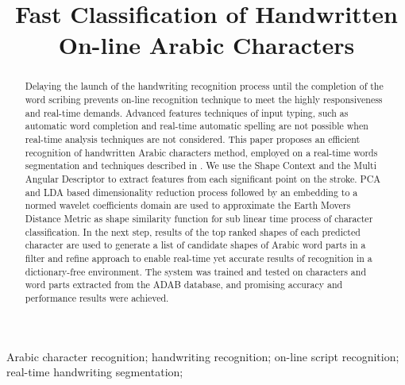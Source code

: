 \documentclass[10pt, conference, compsocconf]{IEEEtran}
\begin{document}
\title{Fast Classification of Handwritten On-line Arabic Characters}

\author{
\and
{}
}

\maketitle

\begin{abstract}
Delaying the launch of the handwriting recognition process until the completion of the word scribing prevents on-line recognition technique to meet the highly responsiveness and real-time demands.
Advanced features techniques of input typing, such as automatic word completion and real-time automatic spelling are not possible when real-time analysis techniques are not considered. 
This paper proposes an efficient recognition of handwritten Arabic characters method, employed on a real-time words segmentation and techniques described in \cite{kour2014real}.
We use the Shape Context and the Multi Angular Descriptor to extract features from each significant point on the stroke. 
PCA and LDA based dimensionality reduction process followed by an embedding to a normed wavelet coefficients domain are used to approximate the Earth Movers Distance Metric as shape similarity function for sub linear time process of character classification. 
In the next step, results of the top ranked shapes of each predicted character are used to generate a list of candidate shapes of Arabic word parts in a filter and refine approach to enable real-time yet accurate results of recognition in a dictionary-free environment.
The system was trained and tested on characters and word parts extracted from the ADAB database, and promising accuracy and performance results were achieved.
\end{abstract}

\begin{IEEEkeywords}
Arabic character recognition; handwriting recognition; on-line script recognition; real-time handwriting segmentation;
\end{IEEEkeywords}
\end{document}
